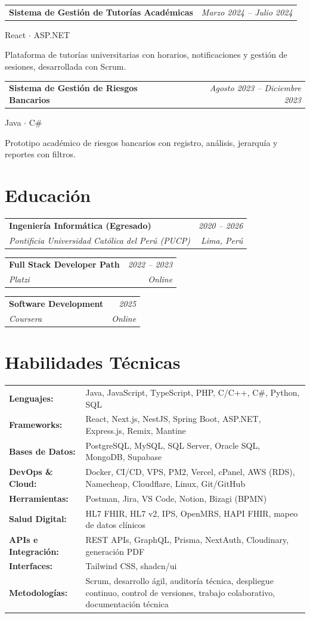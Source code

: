 \documentclass[a4paper,10pt]{article}
\makeatletter
\newcommand{\cvsubheading}[4]{
  \vspace{2pt}
  \begin{tabularx}{\textwidth}{@{}X r@{}}
    \textbf{#1} & \textit{\small #2} \\
    \textit{\small\color{graytext} #3} & \textit{\small\color{graytext} #4} \\
  \end{tabularx}\vspace{-2pt}
}
\newcommand{\cvproject}[3]{
  \vspace{2pt}
  \begin{tabularx}{\textwidth}{@{}X r@{}}
    \textbf{#1} & \textit{\small #2} \\
  \end{tabularx}
  {\small\color{graytext} #3}\vspace{-2pt}
}
\makeatother
\begin{document}
\cvproject{Sistema de Gesti\'on de Tutor\'ias Acad\'emicas}{Marzo 2024 -- Julio 2024}{React $\cdot$ ASP.NET}
\par\smallskip Plataforma de tutorías universitarias con horarios, notificaciones y gestión de sesiones, desarrollada con Scrum.\par\medskip

\cvproject{Sistema de Gesti\'on de Riesgos Bancarios}{Agosto 2023 -- Diciembre 2023}{Java $\cdot$ C\#}
\par\smallskip Prototipo académico de riesgos bancarios con registro, análisis, jerarquía y reportes con filtros.\par\medskip

\section{Educaci\'on}

\cvsubheading
  {Ingenier\'ia Inform\'atica (Egresado)}{2020 -- 2026}
  {Pontificia Universidad Cat\'olica del Per\'u (PUCP)}{Lima, Per\'u}

\vspace{2pt}
\cvsubheading
  {Full Stack Developer Path}{2022 -- 2023}
  {Platzi}{Online}

\vspace{2pt}
\cvsubheading
  {Software Development}{2025}
  {Coursera}{Online}

\section{Habilidades T\'ecnicas}

\begin{tabularx}{\textwidth}{@{}l X@{}}
  \textbf{Lenguajes:} & Java, JavaScript, TypeScript, PHP, C/C++, C\#, Python, SQL \\[3pt]
  \textbf{Frameworks:} & React, Next.js, NestJS, Spring Boot, ASP.NET, Express.js, Remix, Mantine \\[3pt]
  \textbf{Bases de Datos:} & PostgreSQL, MySQL, SQL Server, Oracle SQL, MongoDB, Supabase \\[3pt]
  \textbf{DevOps \& Cloud:} & Docker, CI/CD, VPS, PM2, Vercel, cPanel, AWS (RDS), Namecheap, Cloudflare, Linux, Git/GitHub \\[3pt]
  \textbf{Herramientas:} & Postman, Jira, VS Code, Notion, Bizagi (BPMN) \\[3pt]
  \textbf{Salud Digital:} & HL7 FHIR, HL7 v2, IPS, OpenMRS, HAPI FHIR, mapeo de datos clínicos \\[3pt]
  \textbf{APIs e Integración:} & REST APIs, GraphQL, Prisma, NextAuth, Cloudinary, generación PDF \\[3pt]
  \textbf{Interfaces:} & Tailwind CSS, shadcn/ui \\[3pt]
  \textbf{Metodolog\'ias:} & Scrum, desarrollo \'agil, auditor\'ia t\'ecnica, despliegue continuo, control de versiones, trabajo colaborativo, documentaci\'on t\'ecnica \\
\end{tabularx}
\end{document}
